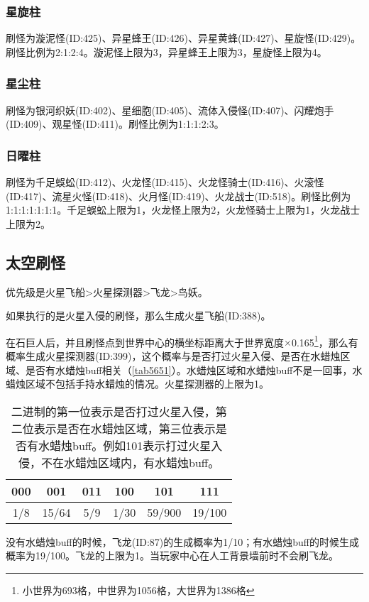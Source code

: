 \subsubsection{星旋柱}
刷怪为漩泥怪(ID:425)、异星蜂王(ID:426)、异星黄蜂(ID:427)、星旋怪(ID:429)。刷怪比例为2:1:2:4。漩泥怪上限为3，异星蜂王上限为3，星旋怪上限为4。

\subsubsection{星尘柱}
刷怪为银河织妖(ID:402)、星细胞(ID:405)、流体入侵怪(ID:407)、闪耀炮手(ID:409)、观星怪(ID:411)。刷怪比例为1:1:1:2:3。

\subsubsection{日曜柱}
刷怪为千足蜈蚣(ID:412)、火龙怪(ID:415)、火龙怪骑士(ID:416)、火滚怪(ID:417)、流星火怪(ID:418)、火月怪(ID:419)、火龙战士(ID:518)。刷怪比例为1:1:1:1:1:1:1。千足蜈蚣上限为1，火龙怪上限为2，火龙怪骑士上限为1，火龙战士上限为2。

\subsection{太空刷怪}
优先级是火星飞船>火星探测器>飞龙>鸟妖。

如果执行的是火星入侵的刷怪，那么生成火星飞船(ID:388)。

在石巨人后，并且刷怪点到世界中心的横坐标距离大于世界宽度$\times$0.165\footnote{小世界为693格，中世界为1056格，大世界为1386格}，那么有概率生成火星探测器(ID:399)，这个概率与是否打过火星入侵、是否在水蜡烛区域、是否有水蜡烛buff相关（\autoref{tab5651}）。水蜡烛区域和水蜡烛buff不是一回事，水蜡烛区域不包括手持水蜡烛的情况。火星探测器的上限为1。

\begin{table}[!h]
    \centering
    \begin{tabular}{cccccc}
         000&001&011&100&101&111\\\hline
         1/8&15/64&5/9&1/30&59/900&19/100 
    \end{tabular}
    \caption{二进制的第一位表示是否打过火星入侵，第二位表示是否在水蜡烛区域，第三位表示是否有水蜡烛buff。例如101表示打过火星入侵，不在水蜡烛区域内，有水蜡烛buff。}
    \label{tab5651}
\end{table}

没有水蜡烛buff的时候，飞龙(ID:87)的生成概率为1/10；有水蜡烛buff的时候生成概率为19/100。飞龙的上限为1。当玩家中心在人工背景墙前时不会刷飞龙。

